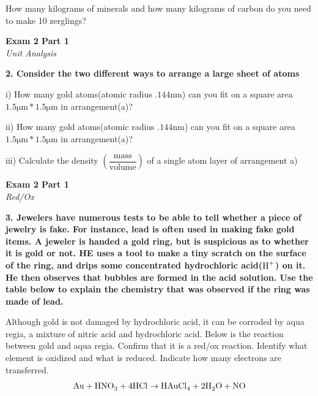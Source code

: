 \documentclass{article}
\begin{document}
    How many kilograms of minerals and how many kilograms of carbon do you need to make 10 zerglings?

    \pagebreak

    \begin{center}
        \textbf{Exam 2 Part 1}\\
        \textit{Unit Analysis}
    \end{center}
    \textbf{2. Consider the two different ways to arrange a large sheet of atoms}

    i) How many gold atoms(atomic radius $.144 \si{\nano\metre}$) can you fit on a square area $1.5 \si{\micro\metre} * 1.5 \si{\micro\metre}$ in arrangement(a)?

    ii) How many gold atoms(atomic radius $.144 \si{\nano\metre}$) can you fit on a square area $1.5 \si{\micro\metre} * 1.5 \si{\micro\metre}$ in arrangement(a)?

    iii) Calculate the density $(\dfrac{\text{mass}}{\text{volume}})$ of a single atom layer of arrangement a)

    \pagebreak

    \begin{center}
        \textbf{Exam 2 Part 1}\\
        \textit{Red/Ox}
    \end{center}
    \textbf{3. Jewelers have numerous tests to be able to tell whether a piece of jewelry is fake. For instance, lead is often used in making fake gold items. A jeweler is handed a gold ring, but is suspicious as to whether it is gold or not. HE uses a tool to make a tiny scratch on the surface of the ring, and drips some concentrated hydrochloric acid($\ce{H^{+}}$) on it. He then observes that bubbles are formed in the acid solution. Use the table below to explain the chemistry that was observed if the ring was made of lead.}

    Although gold is not damaged by hydrochloric acid, it can be corroded by aqua regia, a mixture of nitric acid and hydrochloric acid. Below is the reaction between gold and aqua regia. Confirm that it is a red/ox reaction. Identify what element is oxidized and what is reduced. Indicate how many electrons are transferred.
    $$\ce{Au} + \ce{HNO_{3}} + \ce{4 HCl} \rightarrow \ce{HAuCl_{4}} + \ce{2 H_{2}O} + \ce{NO}$$
\end{document}
